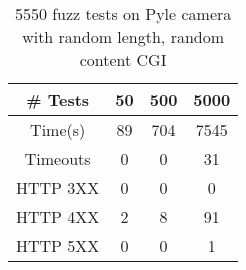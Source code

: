 \documentclass[letterpaper,twocolumn,10pt]{article}
\begin{document}
\begin{table}
\centering
	\begin{tabular}{ |c|c|c|c| }
		\hline
		\# Tests & 50 & 500 & 5000 \\
		\hline
		\hline
		Time(s) & 89 & 704 & 7545 \\
		Timeouts & 0 & 0 & 31  \\
		HTTP 3XX & 0 & 0 & 0 \\
		HTTP 4XX & 2 & 8 & 91 \\
		HTTP 5XX & 0 & 0 & 1 \\
		\hline
	\end{tabular}
	\caption{5550 fuzz tests on Pyle camera with random length, random content CGI}
	\label{tab:Pyle_Rand_CGI} 
\end{table}







{\footnotesize 
}
\end{document}
